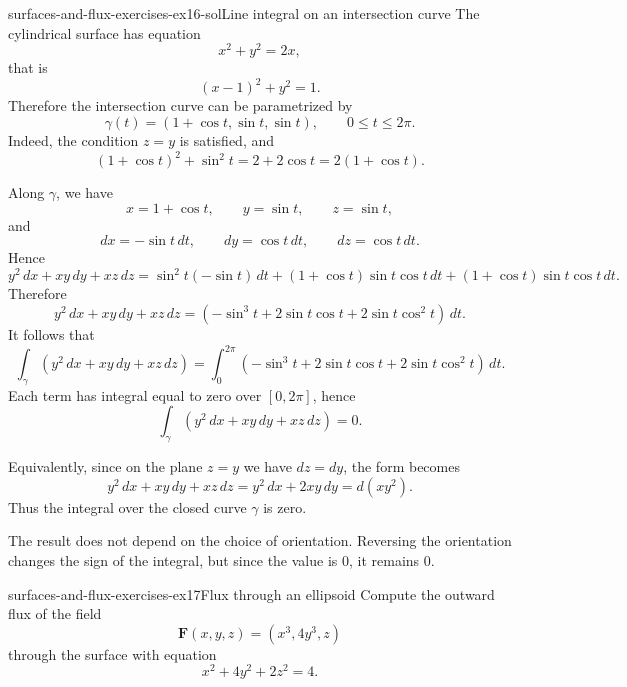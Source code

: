 \documentclass[preview]{standalone}
\begin{document}
\begin{snippetsolution}{surfaces-and-flux-exercises-ex16-sol}{Line integral on an intersection curve}
    The cylindrical surface has equation
    \[
        x^2+y^2=2x,
    \]
    that is
    \[
        (x-1)^2+y^2=1.
    \]
    Therefore the intersection curve can be parametrized by
    \[
        \gamma(t)=(1+\cos t,\sin t,\sin t),
        \qquad 0\leq t\leq 2\pi.
    \]
    Indeed, the condition \(z=y\) is satisfied, and
    \[
        (1+\cos t)^2+\sin^2t
        =
        2+2\cos t
        =
        2(1+\cos t).
    \]

    Along \(\gamma\), we have
    \[
        x=1+\cos t,
        \qquad
        y=\sin t,
        \qquad
        z=\sin t,
    \]
    and
    \[
        dx=-\sin t\,dt,
        \qquad
        dy=\cos t\,dt,
        \qquad
        dz=\cos t\,dt.
    \]
    Hence
    \[
        y^2\,dx+xy\,dy+xz\,dz
        =
        \sin^2t(-\sin t)\,dt
        +(1+\cos t)\sin t\cos t\,dt
        +(1+\cos t)\sin t\cos t\,dt.
    \]
    Therefore
    \[
        y^2\,dx+xy\,dy+xz\,dz
        =
        \left(
            -\sin^3t
            +2\sin t\cos t
            +2\sin t\cos^2t
        \right)\,dt.
    \]
    It follows that
    \[
        \int_\gamma
        \left(
            y^2\,dx+xy\,dy+xz\,dz
        \right)
        =
        \int_0^{2\pi}
        \left(
            -\sin^3t
            +2\sin t\cos t
            +2\sin t\cos^2t
        \right)
        \,dt.
    \]
    Each term has integral equal to zero over \([0,2\pi]\), hence
    \[
        \int_\gamma
        \left(
            y^2\,dx+xy\,dy+xz\,dz
        \right)
        =
        0.
    \]

    Equivalently, since on the plane \(z=y\) we have \(dz=dy\), the form becomes
    \[
        y^2\,dx+xy\,dy+xz\,dz
        =
        y^2\,dx+2xy\,dy
        =
        d(xy^2).
    \]
    Thus the integral over the closed curve \(\gamma\) is zero.

    The result does not depend on the choice of orientation. Reversing the orientation changes the sign of the integral, but since the value is \(0\), it remains \(0\).
\end{snippetsolution}

\begin{snippetexercise}{surfaces-and-flux-exercises-ex17}{Flux through an ellipsoid}
    Compute the outward flux of the field \[\mathbf{F}(x,y,z)=\left(x^3,4y^3,z\right)\] through the surface with equation \[x^2+4y^2+2z^2=4.\]
\end{snippetexercise}
\end{document}
